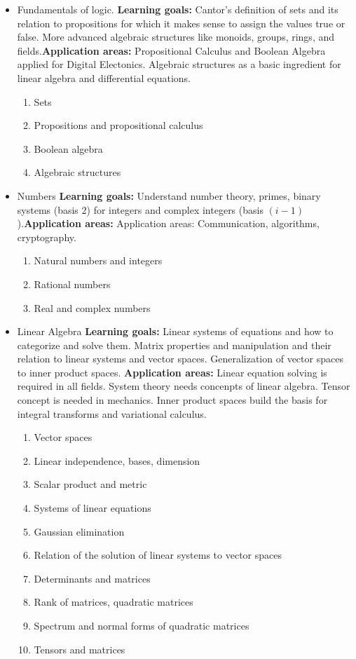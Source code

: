 \documentclass[12pt,twoside,fleqn,a4paper]{article}
\newcommand{\goalapps}[2]{\newline\textbf{Learning goals:} #1\newline\textbf{Application areas:} #2}
\begin{document}
\begin{itemize}
\setlength\itemsep{0cm}
\item Fundamentals of logic. 
\goalapps{Cantor's definition of sets and its relation to propositions for which it makes sense to assign the values true or false. More advanced algebraic structures like monoids, groups, rings, and fields.}{Propositional Calculus and Boolean Algebra applied for Digital Electonics. Algebraic structures as a basic ingredient for linear algebra and differential equations.}
\begin{enumerate}
    \item Sets
    \item Propositions and propositional calculus 
    \item Boolean algebra
    \item Algebraic structures
\end{enumerate}
\item Numbers
\goalapps{
Understand number theory, primes, binary systems (basis $2$) for integers and complex integers (basis $(i-1)$).}{
Application areas: Communication, algorithms, cryptography.}
\begin{enumerate}
    \item Natural numbers and integers
    \item Rational numbers
    \item Real and complex numbers
\end{enumerate}

\item Linear Algebra
\goalapps{
Linear systems of equations and how to categorize and solve them. Matrix properties and manipulation and their relation to linear systems and vector spaces. Generalization of vector spaces to inner product spaces.
}{
Linear equation solving is required in all fields. System theory needs concenpts of linear algebra. Tensor concept is needed in mechanics. Inner product spaces build the basis for integral transforms and variational calculus.}
\begin{enumerate}
    \item Vector spaces
    \item Linear independence, bases, dimension
    \item Scalar product and metric
    \item Systems of linear equations
    \item Gaussian elimination
    \item Relation of the solution of linear systems to vector spaces
    \item Determinants and matrices
    \item Rank of matrices, quadratic matrices
    \item Spectrum and normal forms of quadratic matrices
    \item Tensors and matrices
\end{enumerate}
\end{itemize}
\end{document}
